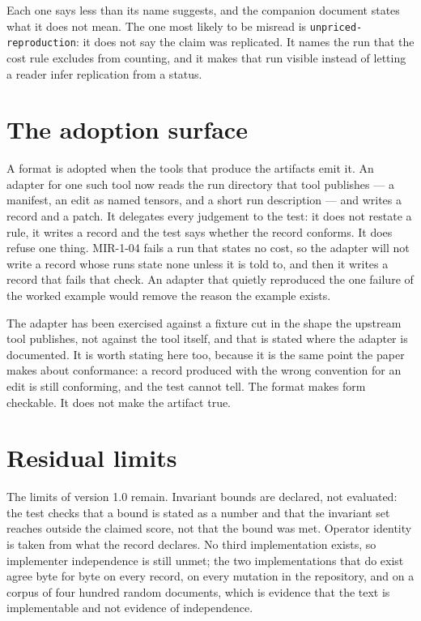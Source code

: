\documentclass[11pt]{article}
\begin{document}
Each one says less than its name suggests, and the companion document states
what it does not mean. The one most likely to be misread is
\texttt{unpriced-reproduction}: it does not say the claim was replicated. It
names the run that the cost rule excludes from counting, and it makes that run
visible instead of letting a reader infer replication from a status.

\section{The adoption surface}

A format is adopted when the tools that produce the artifacts emit it. An
adapter for one such tool now reads the run directory that tool publishes --- a
manifest, an edit as named tensors, and a short run description --- and writes a
record and a patch. It delegates every judgement to the test: it does not
restate a rule, it writes a record and the test says whether the record
conforms. It does refuse one thing. MIR-1-04 fails a run that states no cost, so
the adapter will not write a record whose runs state none unless it is told to,
and then it writes a record that fails that check. An adapter that quietly
reproduced the one failure of the worked example would remove the reason the
example exists.

The adapter has been exercised against a fixture cut in the shape the upstream
tool publishes, not against the tool itself, and that is stated where the
adapter is documented. It is worth stating here too, because it is the same
point the paper makes about conformance: a record produced with the wrong
convention for an edit is still conforming, and the test cannot tell. The format
makes form checkable. It does not make the artifact true.

\section{Residual limits}

The limits of version 1.0 remain. Invariant bounds are declared, not evaluated:
the test checks that a bound is stated as a number and that the invariant set
reaches outside the claimed score, not that the bound was met. Operator identity
is taken from what the record declares. No third implementation exists, so
implementer independence is still unmet; the two implementations that do exist
agree byte for byte on every record, on every mutation in the repository, and on
a corpus of four hundred random documents, which is evidence that the text is
implementable and not evidence of independence.
\end{document}
